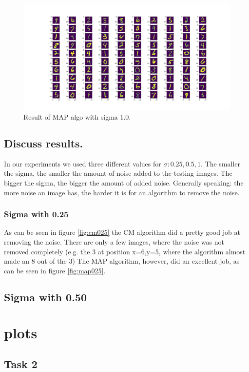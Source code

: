 \documentclass{article}
\begin{document}
\begin{figure}[h]
  \includegraphics[width=\linewidth]{sigma_100_map.png}
  \caption{Result of MAP algo with sigma 1.0.}
  \label{fig:map100}
\end{figure}

\subsection{Discuss results.}
In our experiments we used three different values for $\sigma: 0.25, 0.5, 1$. The smaller the sigma, the smaller the amount of noise added to the testing images. The bigger the sigma, the bigger the amount of added noise. Generally speaking: the more noise an image has, the harder it is for an algorithm to remove the noise.

\subsubsection{Sigma with 0.25}
As can be seen in figure \ref{fig:cm025} the CM algorithm did a pretty good job at removing the noise. There are only a few images, where the noise was not removed completely (e.g. the 3 at position x=6,y=5, where the algorithm almost made an 8 out of the 3) The MAP algorithm, however, did an excellent job, as can be seen in figure \ref{fig:map025}.

\subsection{Sigma with 0.50}

\clearpage
\section{plots}
\label{plots}
\subsection{Task 2}
\end{document}
